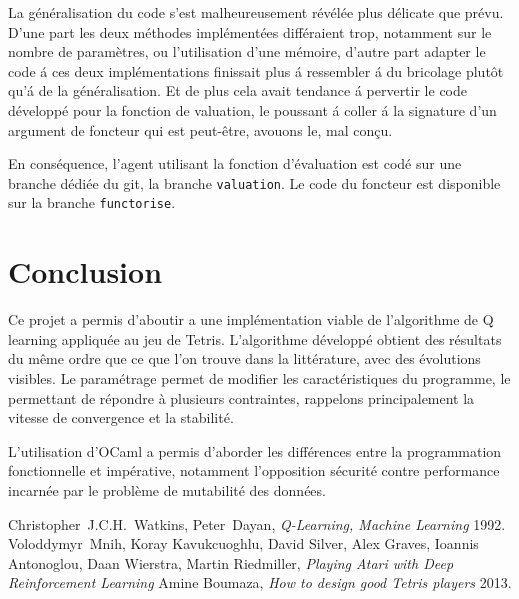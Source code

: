 \documentclass{report}
\begin{document}
La généralisation du code s'est malheureusement révélée plus
délicate que prévu. D'une part les deux méthodes implémentées
différaient trop, notamment sur le nombre de paramètres, ou
l'utilisation d'une mémoire, d'autre part adapter le code \'a ces deux
implémentations finissait plus \'a ressembler \'a du bricolage plutôt qu'\'a
de la généralisation. Et de plus cela avait tendance \'a pervertir le code
développé pour la fonction de valuation, le poussant \'a coller \'a la
signature d'un argument de foncteur qui est peut-être, avouons le, mal conçu.

En conséquence, l'agent utilisant la fonction d'évaluation est codé sur
une branche dédiée du git, la branche \texttt{valuation}. Le code du
foncteur est disponible sur la branche \texttt{functorise}.
\chapter*{Conclusion}
Ce projet a permis d'aboutir a une implémentation viable de l'algorithme de Q
learning appliquée au jeu de Tetris. L'algorithme développé obtient des résultats
du même ordre que ce que l'on trouve dans la littérature, avec des évolutions
visibles. Le paramétrage permet de modifier les caractéristiques du programme,
le permettant de répondre à plusieurs contraintes, rappelons principalement la
vitesse de convergence et la stabilité.

L'utilisation d'OCaml a permis d'aborder les différences entre la programmation
fonctionnelle et impérative, notamment l'opposition sécurité contre performance
incarnée par le problème de mutabilité des données.

\begin{thebibliography}{9}
    Christopher~J.C.H.~Watkins, Peter~Dayan,
    \textit{Q-Learning, Machine Learning}
    1992.
    Voloddymyr~Mnih, Koray Kavukcuoghlu, David Silver, Alex Graves, Ioannis
    Antonoglou, Daan Wierstra, Martin Riedmiller,
    \textit{Playing Atari with Deep Reinforcement Learning}
    Amine Boumaza,
    \textit{How to design good Tetris players}
    2013.
\end{thebibliography}
\end{document}
